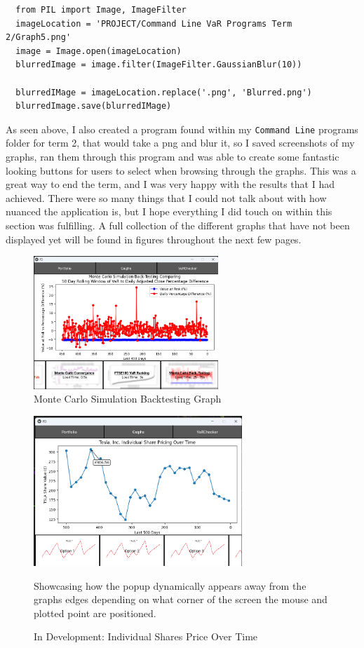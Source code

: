 \documentclass{article}
\begin{document}
\begin{verbatim}
  from PIL import Image, ImageFilter
  imageLocation = 'PROJECT/Command Line VaR Programs Term 2/Graph5.png'
  image = Image.open(imageLocation)
  blurredImage = image.filter(ImageFilter.GaussianBlur(10))

  blurredIMage = imageLocation.replace('.png', 'Blurred.png')
  blurredImage.save(blurredIMage)
\end{verbatim}  

As seen above, I also created a program found within my \texttt{Command Line} programs folder for term 2, that would take a png and blur it, so I saved screenshots of my graphs, ran them through this program and was able to create some fantastic looking buttons for users to select when browsing through the graphs. This was a great way to end the term, and I was very happy with the results that I had achieved. There were so many things that I could not talk about with how nuanced the application is, but I hope everything I did touch on within this section was fulfilling. A full collection of the different graphs that have not been displayed yet will be found in figures throughout the next few pages.

\begin{figure}[h]
  \centering
  \includegraphics[width=0.62\textwidth]{Images/Term 2 Images/image.png}
  \caption{Monte Carlo Simulation Backtesting Graph}
  \label{fig:Backtesting Visualised}
\end{figure}

\begin{figure}[H]
  \centering
  \includegraphics[width=0.7\textwidth]{Images/Term 2 Images/image (4).png}
  \caption{In Development: Individual Shares Price Over Time }
  \label{fig:Individual Shares Price Over Time}
  \par
  \smallskip
  Showcasing how the popup dynamically appears away from the graphs edges depending on what corner of the screen the mouse and plotted point are positioned.
\end{figure}
\end{document}
